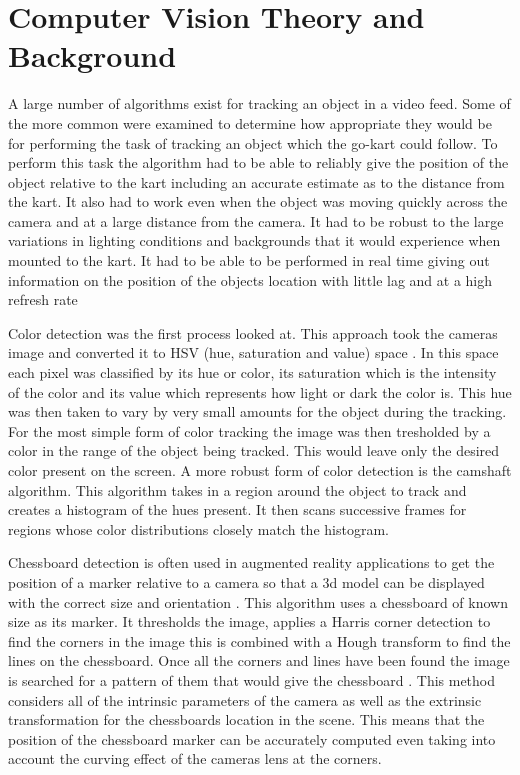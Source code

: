 \section{Computer Vision Theory and Background}

A large number of algorithms exist for tracking an object in a video feed. Some of the more common were examined to determine how appropriate they would be for performing the task of tracking an object which the go-kart could follow. To perform this task the algorithm had to be able to reliably give the position of the object relative to the kart including an accurate estimate as to the distance from the kart. It also had to work even when the object was moving quickly across the camera and at a large distance from the camera. It had to be robust to the large variations in lighting conditions and backgrounds that it would experience when mounted to the kart. It had to be able to be performed in real time giving out information on the position of the objects location with little lag and at a high refresh rate

Color detection was the first process looked at. This approach took the cameras image and converted it to HSV (hue, saturation and value) space \cite{hsv}. In this space each pixel was classified by its hue or color, its saturation which is the intensity of the color and its value which represents how light or dark the color is. This hue was then taken to vary by very small amounts  for the object during the tracking. For the most simple form of color tracking the image was then tresholded by a color in the range of the object being tracked. This would leave only the desired color present on the screen. A more robust form of color detection is the camshaft algorithm. This algorithm takes in a region around the object to track and creates a histogram of the hues present. It then scans successive frames for regions whose color distributions closely match the histogram.  

Chessboard detection is often used in augmented reality applications to get the position of a marker relative to a camera so that a 3d model can be displayed with the correct size and orientation \cite{augmented}. This algorithm uses a chessboard of known size as its marker. It thresholds the image, applies a Harris corner detection to find the corners in the image this is combined with a Hough transform to find the lines on the chessboard. Once all the corners and lines have been found the image is searched for a pattern of them that would give the chessboard \cite{chessboard}. This method considers all of the intrinsic parameters of the camera as well as the extrinsic transformation for the chessboards location in the scene. This means that the position of the chessboard marker can be accurately computed even taking into  account the curving effect of the cameras lens at the corners. 

